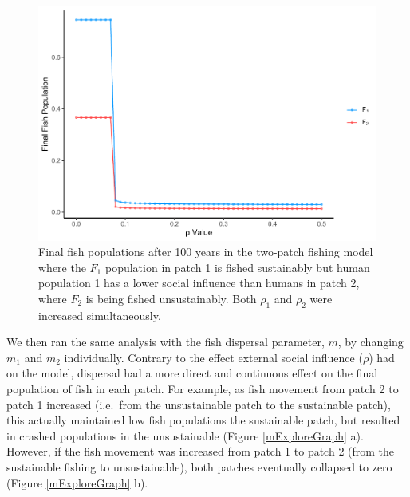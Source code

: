 \documentclass[
  12pt,
]{article}
\begin{document}
\begin{figure}
\centering
\includegraphics{Wulfing_CH2_Draft4_files/figure-latex/rhoExploreGraph-1.pdf}
\caption{\label{fig:rhoExploreGraph}Final fish populations after 100 years in the two-patch fishing model where the \(F_1\) population in patch 1 is fished sustainably but human population 1 has a lower social influence than humans in patch 2, where \(F_2\) is being fished unsustainably. Both \(\rho_1\) and \(\rho_2\) were increased simultaneously. \label{rhoExploreGraph}}
\end{figure}

We then ran the same analysis with the fish dispersal parameter, \(m\), by changing \(m_1\) and \(m_2\) individually. Contrary to the effect external social influence (\(\rho\)) had on the model, dispersal had a more direct and continuous effect on the final population of fish in each patch. For example, as fish movement from patch 2 to patch 1 increased (i.e.~from the unsustainable patch to the sustainable patch), this actually maintained low fish populations the sustainable patch, but resulted in crashed populations in the unsustainable (Figure \ref{mExploreGraph} a). However, if the fish movement was increased from patch 1 to patch 2 (from the sustainable fishing to unsustainable), both patches eventually collapsed to zero (Figure \ref{mExploreGraph} b).
\end{document}
